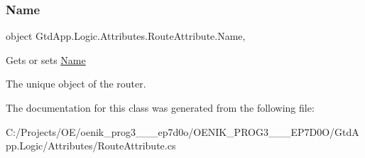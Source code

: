 \subsubsection{\texorpdfstring{Name}{Name}}
{\footnotesize\ttfamily object Gtd\+App.\+Logic.\+Attributes.\+Route\+Attribute.\+Name\hspace{0.3cm}{\ttfamily [get]}, {\ttfamily [set]}}



Gets or sets \mbox{\hyperlink{class_gtd_app_1_1_logic_1_1_attributes_1_1_route_attribute_ae693a8f18d169efaccf1681eb09a9adb}{Name}} 

The unique object of the router.

The documentation for this class was generated from the following file\+:\begin{DoxyCompactItemize}
\item 
C\+:/\+Projects/\+O\+E/oenik\+\_\+prog3\+\_\+\_\+\_\+ep7d0o/\+O\+E\+N\+I\+K\+\_\+\+P\+R\+O\+G3\+\_\+\_\+\_\+\+E\+P7\+D0\+O/\+Gtd\+App.\+Logic/\+Attributes/Route\+Attribute.\+cs\end{DoxyCompactItemize}
